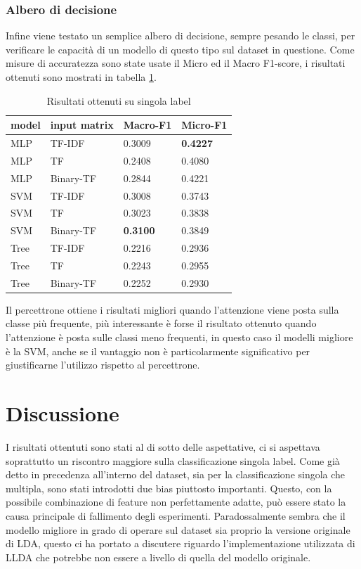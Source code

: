 \documentclass[technote]{IEEEtran}
\begin{document}
\subsubsection{Albero di decisione}
Infine viene testato un semplice albero di decisione, sempre pesando le classi, per verificare le capacità di un modello di questo tipo sul dataset in questione.
\indent Come misure di accuratezza sono state usate il Micro ed il Macro F1-score, i risultati ottenuti sono mostrati in tabella \ref{t_res_single}.
\begin{table}[H]
\centering
\caption{Risultati ottenuti su singola label}
\begin{tabular}{|l|l|l|l|}
\hline
\textbf{model} & \textbf{input matrix} & \textbf{Macro-F1} & \textbf{Micro-F1} \\ \hline
MLP            & TF-IDF                & 0.3009            & \textbf{0.4227}   \\ \hline
MLP            & TF                    & 0.2408            & 0.4080            \\ \hline
MLP            & Binary-TF             & 0.2844            & 0.4221            \\ \hline
SVM            & TF-IDF                & 0.3008            & 0.3743            \\ \hline
SVM            & TF                    & 0.3023            & 0.3838            \\ \hline
SVM            & Binary-TF             & \textbf{0.3100}   & 0.3849            \\ \hline
Tree           & TF-IDF                & 0.2216            & 0.2936            \\ \hline
Tree           & TF                    & 0.2243            & 0.2955            \\ \hline
Tree           & Binary-TF             & 0.2252            & 0.2930            \\ \hline
\end{tabular}
\label{t_res_single}
\end{table}
Il percettrone ottiene i risultati migliori quando l'attenzione viene posta sulla classe più frequente, più interessante è forse il risultato ottenuto quando l'attenzione è posta sulle classi meno frequenti, in questo caso il modelli migliore è la SVM, anche se il vantaggio non è particolarmente significativo per giustificarne l'utilizzo rispetto al percettrone.
\section{Discussione}
I risultati ottentuti sono stati al di sotto delle aspettative, ci si aspettava soprattutto un riscontro maggiore sulla classificazione singola label. Come già detto in precedenza all'interno del dataset, sia per la classificazione singola che multipla, sono stati introdotti due bias piuttosto importanti. Questo, con la possibile combinazione di feature non perfettamente adatte, può essere stato la causa principale di fallimento degli esperimenti. Paradossalmente sembra che il modello migliore in grado di operare sul dataset sia proprio la versione originale di LDA, questo ci ha portato a discutere riguardo l'implementazione utilizzata di LLDA che potrebbe non essere a livello di quella del modello originale.
\end{document}
